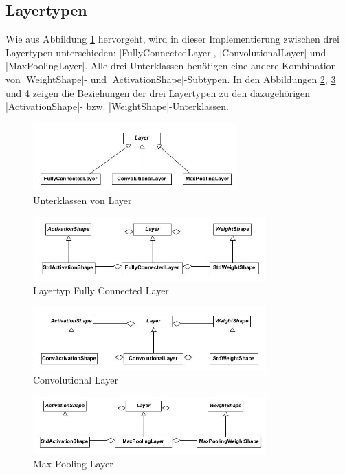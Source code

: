\documentclass[../main.tex]{subfiles}
\begin{document}
\subsection{Layertypen}
Wie aus Abbildung \ref{pic:cd_Netdesc_layers} hervorgeht, wird in dieser Implementierung zwischen drei Layertypen unterschieden: |FullyConnectedLayer|, |ConvolutionalLayer| und |MaxPoolingLayer|. Alle drei Unterklassen benötigen eine andere Kombination von |WeightShape|- und |ActivationShape|-Subtypen. In den Abbildungen \ref{pic:cd_Netdesc_fullyconnected}, \ref{pic:cd_Netdesc_conv} und \ref{pic:cd_Netdesc_maxpooling} zeigen die Beziehungen der drei Layertypen zu den dazugehörigen |ActivationShape|- bzw. |WeightShape|-Unterklassen. 
\begin{figure}
	\centering 
	\includegraphics[width=0.7\textwidth]{../images/Schmidt/cd_netdesc_layers.jpg} 
	\caption {Unterklassen von Layer}
	\label{pic:cd_Netdesc_layers} 
\end{figure} 
\begin{figure}
	\centering 
	\includegraphics[width=0.8\textwidth]{../images/Schmidt/cd_netdesc_fullyconnected.jpg} 
	\caption {Layertyp Fully Connected Layer}
	\label{pic:cd_Netdesc_fullyconnected} 
\end{figure} 
\begin{figure}
	\centering 
	\includegraphics[width=0.8\textwidth]{../images/Schmidt/cd_netdesc_conv.jpg} 
	\caption {Convolutional Layer}
	\label{pic:cd_Netdesc_conv} 
\end{figure} 
\begin{figure}
	\centering 
	\includegraphics[width=0.8\textwidth]{../images/Schmidt/cd_netdesc_maxpool.jpg} 
	\caption {Max Pooling Layer}
	\label{pic:cd_Netdesc_maxpooling} 
\end{figure} 
\end{document}
